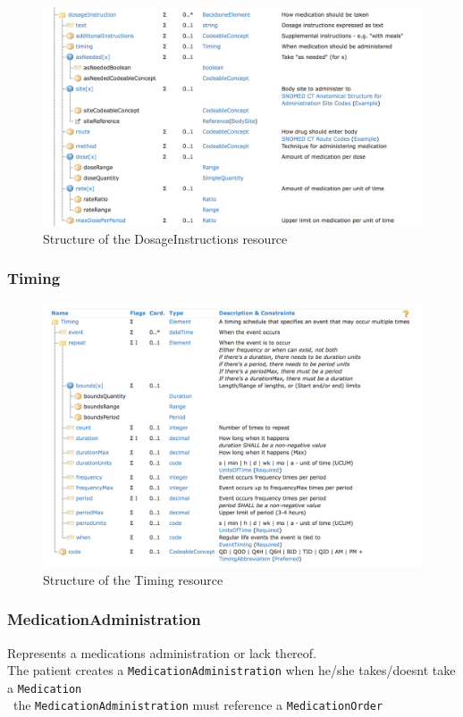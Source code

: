 \documentclass{article}
\begin{document}
\begin{figure}[H]
\centering
\includegraphics[width=\linewidth]{resources/FHIR/DosageInstructions/DosageInstruction-Structure.png}
\caption{Structure of the DosageInstructions resource}
\label{fig:structure-dosageinstructions}
\end{figure}


\subsubsection{Timing}\label{res:timing}
\begin{figure}[H]
\centering
\includegraphics[width=\linewidth]{resources/FHIR/DosageInstructions/Timing-Structure.png}
\caption{Structure of the Timing resource}
\label{fig:structure-timing}
\end{figure}


\subsubsection{MedicationAdministration}\label{res:medicationadministration}
Represents a medications administration or lack thereof.
\\
The patient creates a \texttt{MedicationAdministration} when he/she takes/doesnt take a \texttt{Medication}
\\\
the \texttt{MedicationAdministration} must reference a \texttt{MedicationOrder}
\end{document}
